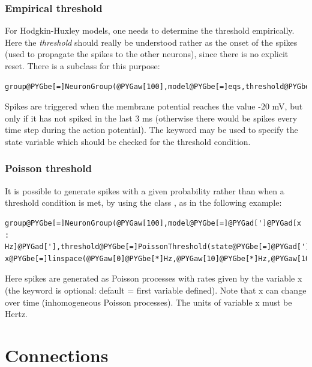 \documentclass[letterpaper,10pt,english]{manual}
\begin{document}
\subsubsection{Empirical threshold}

For Hodgkin-Huxley models, one needs to determine the threshold empirically. Here the
\emph{threshold} should really be understood rather as the onset of the spikes (used to propagate
the spikes to the other neurons), since there is no explicit reset. There is a
\hyperlink{brian.Threshold}{} subclass for this purpose:

\begin{Verbatim}[commandchars=@\[\]]
group@PYGbe[=]NeuronGroup(@PYGaw[100],model@PYGbe[=]eqs,threshold@PYGbe[=]EmpiricalThreshold(threshold@PYGbe[=]@PYGbe[-]@PYGaw[20]@PYGbe[*]mV,refractory@PYGbe[=]@PYGaw[3]@PYGbe[*]ms))
\end{Verbatim}

Spikes are triggered when the membrane potential reaches the value -20 mV, but only if it
has not spiked in the last 3 ms (otherwise there would be spikes every time step during the action
potential). The  keyword may be used to specify the state variable which should be checked
for the threshold condition.


\subsubsection{Poisson threshold}

It is possible to generate spikes with a given probability rather than when a threshold condition
is met, by using the class , as in the following example:

\begin{Verbatim}[commandchars=@\[\]]
group@PYGbe[=]NeuronGroup(@PYGaw[100],model@PYGbe[=]@PYGad[']@PYGad[x : Hz]@PYGad['],threshold@PYGbe[=]PoissonThreshold(state@PYGbe[=]@PYGad[']@PYGad[x]@PYGad[']))
x@PYGbe[=]linspace(@PYGaw[0]@PYGbe[*]Hz,@PYGaw[10]@PYGbe[*]Hz,@PYGaw[100])
\end{Verbatim}

Here spikes are generated as Poisson processes with rates given by the variable x
(the  keyword is optional: default = first variable defined). Note that x can
change over time (inhomogeneous Poisson processes). The units of variable x must be Hertz.

\resetcurrentobjects


\section{Connections}
\end{document}
